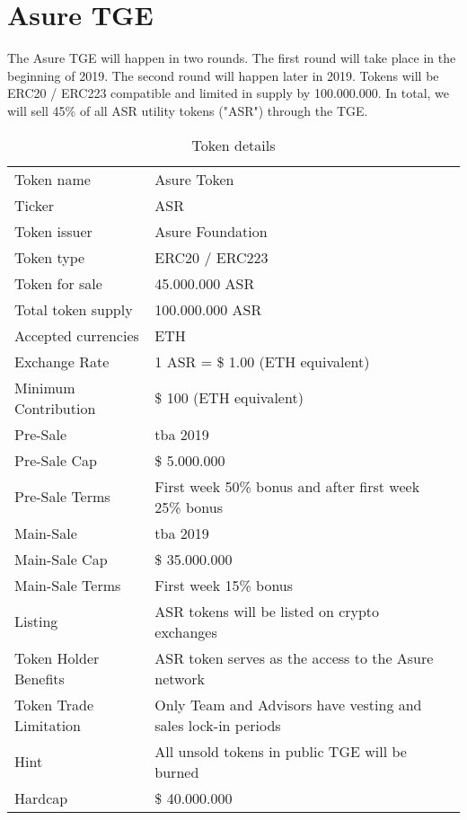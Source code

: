 \section{Asure TGE}

The Asure TGE will happen in two rounds. The first round will take place in the beginning of 2019. The second round will happen later in 2019. Tokens will be ERC20 / ERC223 compatible and limited in supply by 100.000.000. In total, we will sell 45\% of all ASR utility tokens ("ASR") through the TGE. 

\begin{table}[H]
\begin{tabular}{lp{}l}
  Token name & Asure Token \\  
  Ticker & ASR\\
  Token issuer & Asure Foundation\\
  Token type & ERC20 / ERC223 \\
  Token for sale & 45.000.000 ASR \\
  Total token supply & 100.000.000 ASR \\
  Accepted currencies & ETH \\
  Exchange Rate & 1 ASR = \$ 1.00 (ETH equivalent) \\
  Minimum Contribution & \$ 100 (ETH equivalent) \\\hline  
  
  Pre-Sale & tba 2019 \\
  Pre-Sale Cap & \$ 5.000.000 \\
  Pre-Sale Terms & First week 50\% bonus and after first week 25\% bonus \\\hline
  Main-Sale & tba 2019 \\  
  Main-Sale Cap & \$ 35.000.000 \\
  Main-Sale Terms & First week 15\% bonus \\\hline

  Listing & ASR tokens will be listed on crypto exchanges \\
  Token Holder Benefits & ASR token serves as the access to the Asure network \\
  Token Trade Limitation & Only Team and Advisors have vesting and sales lock-in periods \\
  Hint & All unsold tokens in public TGE  will be burned \\\hline  
  
  Hardcap & \$ 40.000.000
  
\end{tabular}
\caption{\label{tab:table-name}Token details}
\end{table}


